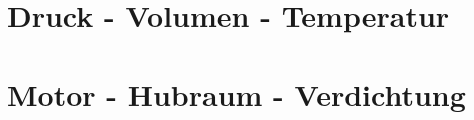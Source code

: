 
\section{Druck - Volumen - Temperatur}\label{sec:Druck-Volumen-Temp}


\section{Motor - Hubraum - Verdichtung}\label{sec:Motor-Hubraum-Verdichtung}





